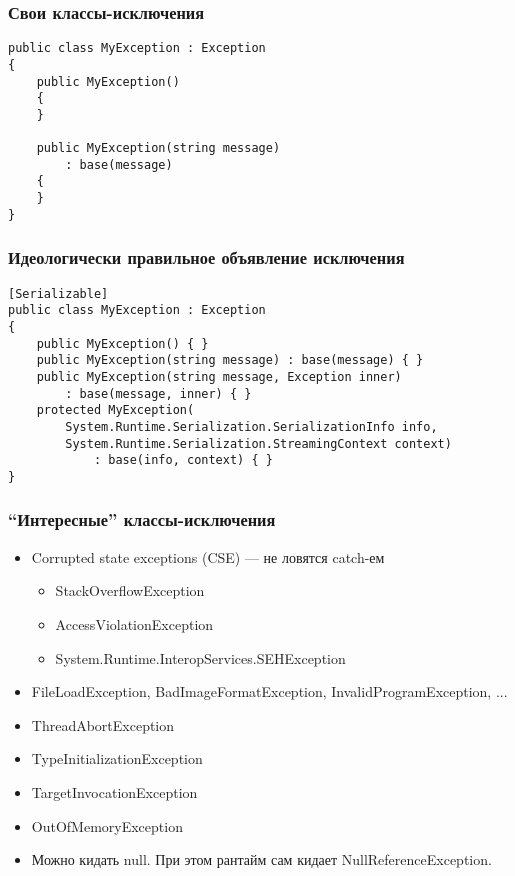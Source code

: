 \documentclass[xetex,mathserif,serif]{beamer}
\begin{document}
    \begin{frame}[fragile]
        \frametitle{Свои классы-исключения}
        \begin{verbatim}
public class MyException : Exception
{
    public MyException() 
    {
    }

    public MyException(string message)
        : base(message)
    {
    }
}
        \end{verbatim}
    \end{frame}

    \begin{frame}[fragile]
        \frametitle{Идеологически правильное объявление исключения}
        \begin{verbatim}
[Serializable]
public class MyException : Exception
{
    public MyException() { }
    public MyException(string message) : base(message) { }
    public MyException(string message, Exception inner) 
        : base(message, inner) { }
    protected MyException(
        System.Runtime.Serialization.SerializationInfo info,
        System.Runtime.Serialization.StreamingContext context)
            : base(info, context) { }
}
        \end{verbatim}
    \end{frame}

    \begin{frame}
        \frametitle{``Интересные'' классы-исключения}
        \begin{itemize}
            \item Corrupted state exceptions (CSE) --- не ловятся catch-ем
            \begin{itemize}
                \item StackOverflowException
                \item AccessViolationException
                \item System.Runtime.InteropServices.SEHException
            \end{itemize}
            \item FileLoadException, BadImageFormatException, InvalidProgramException, ...
            \item ThreadAbortException
            \item TypeInitializationException
            \item TargetInvocationException
            \item OutOfMemoryException
            \item Можно кидать null. При этом рантайм сам кидает NullReferenceException.
        \end{itemize}
    \end{frame}
\end{document}
